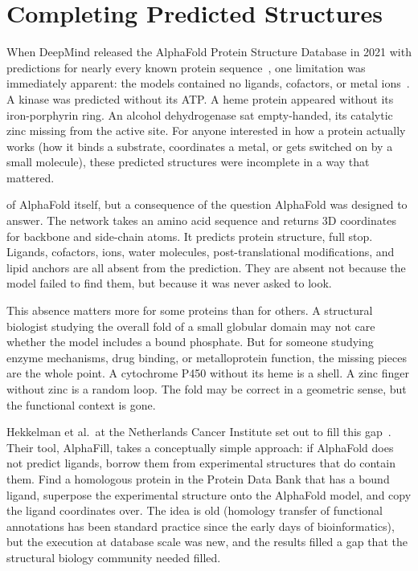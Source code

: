 \chapter{Completing Predicted Structures}
\label{ch:alphafill}

When DeepMind released the AlphaFold Protein Structure Database in 2021 with predictions for nearly every known protein sequence~\cite{varadi2022,jumper2021}, one limitation was immediately apparent: the models contained no ligands, cofactors, or metal ions~\cite{jumper2021}. A kinase was predicted without its ATP. A heme protein appeared without its iron-porphyrin ring. An alcohol dehydrogenase sat empty-handed, its catalytic zinc missing from the active site. For anyone interested in how a protein actually works (how it binds a substrate, coordinates a metal, or gets switched on by a small molecule), these predicted structures were incomplete in a way that mattered.

 of AlphaFold itself, but a consequence of the question AlphaFold was designed to answer. The network takes an amino acid sequence and returns 3D coordinates for backbone and side-chain atoms. It predicts protein structure, full stop. Ligands, cofactors, ions, water molecules, post-translational modifications, and lipid anchors are all absent from the prediction. They are absent not because the model failed to find them, but because it was never asked to look.

This absence matters more for some proteins than for others. A structural biologist studying the overall fold of a small globular domain may not care whether the model includes a bound phosphate. But for someone studying enzyme mechanisms, drug binding, or metalloprotein function, the missing pieces are the whole point. A cytochrome P450 without its heme is a shell. A zinc finger without zinc is a random loop. The fold may be correct in a geometric sense, but the functional context is gone.

Hekkelman et al.\ at the Netherlands Cancer Institute set out to fill this gap~\cite{hekkelman2023}. Their tool, AlphaFill, takes a conceptually simple approach: if AlphaFold does not predict ligands, borrow them from experimental structures that do contain them. Find a homologous protein in the Protein Data Bank that has a bound ligand, superpose the experimental structure onto the AlphaFold model, and copy the ligand coordinates over. The idea is old (homology transfer of functional annotations has been standard practice since the early days of bioinformatics), but the execution at database scale was new, and the results filled a gap that the structural biology community needed filled.


